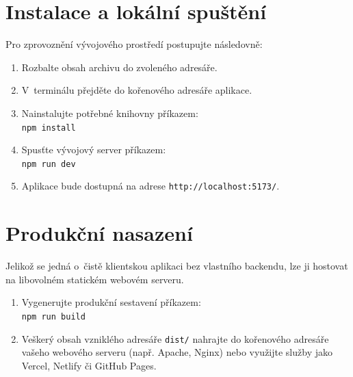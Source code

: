 \section{Instalace a lokální spuštění}
Pro zprovoznění vývojového prostředí postupujte následovně:
\begin{enumerate}
    \item Rozbalte obsah archivu do zvoleného adresáře.
    \item V~terminálu přejděte do kořenového adresáře aplikace.
    \item Nainstalujte potřebné knihovny příkazem: \\ \texttt{npm install}
    \item Spusťte vývojový server příkazem: \\ \texttt{npm run dev}
    \item Aplikace bude dostupná na adrese \texttt{http://localhost:5173/}.
\end{enumerate}

\section{Produkční nasazení}
Jelikož se jedná o~čistě klientskou aplikaci bez vlastního backendu, lze ji hostovat na libovolném statickém webovém serveru.
\begin{enumerate}
    \item Vygenerujte produkční sestavení příkazem: \\ \texttt{npm run build}
    \item Veškerý obsah vzniklého adresáře \texttt{dist/} nahrajte do kořenového adresáře vašeho webového serveru (např. Apache, Nginx) nebo využijte služby jako Vercel, Netlify či GitHub Pages.
\end{enumerate}

